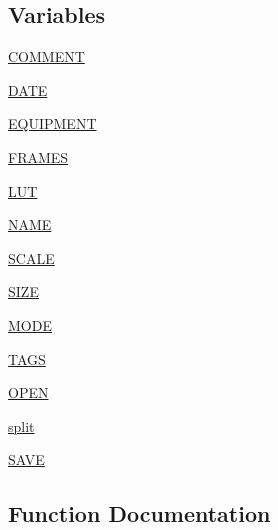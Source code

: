 \subsection*{Variables}
\begin{DoxyCompactItemize}
\item 
\hyperlink{namespacePIL_1_1ImImagePlugin_aa63e36c0a805f7711a938762dc2dd2fb}{C\+O\+M\+M\+E\+NT}
\item 
\hyperlink{namespacePIL_1_1ImImagePlugin_ae34c1a02aa3946d1d6780a08f8fbeecd}{D\+A\+TE}
\item 
\hyperlink{namespacePIL_1_1ImImagePlugin_aa696ff0d0cf51dbd046f461660374494}{E\+Q\+U\+I\+P\+M\+E\+NT}
\item 
\hyperlink{namespacePIL_1_1ImImagePlugin_ac31472366a2522dbd190602954a9fa7a}{F\+R\+A\+M\+ES}
\item 
\hyperlink{namespacePIL_1_1ImImagePlugin_a811631519bff08e117a288c941a2898f}{L\+UT}
\item 
\hyperlink{namespacePIL_1_1ImImagePlugin_ad86b67f48ffce30933911532847a6d6e}{N\+A\+ME}
\item 
\hyperlink{namespacePIL_1_1ImImagePlugin_ab80455cadcfedcd076f3ca41e5d7d96d}{S\+C\+A\+LE}
\item 
\hyperlink{namespacePIL_1_1ImImagePlugin_a0e4f278882f62d9ec6ee7b20db7f87ae}{S\+I\+ZE}
\item 
\hyperlink{namespacePIL_1_1ImImagePlugin_ab4317ba74d15dd41a7364f5f07e6a373}{M\+O\+DE}
\item 
\hyperlink{namespacePIL_1_1ImImagePlugin_aa33556838fc9418de04074f501e2ad6b}{T\+A\+GS}
\item 
\hyperlink{namespacePIL_1_1ImImagePlugin_a8bd71c673e3b9c152fda6b3e5b2022e3}{O\+P\+EN}
\item 
\hyperlink{namespacePIL_1_1ImImagePlugin_a80b2b04cc41efb0cc67fba1c12cb01bd}{split}
\item 
\hyperlink{namespacePIL_1_1ImImagePlugin_adda995198621a6f52a9ac600958968a9}{S\+A\+VE}
\end{DoxyCompactItemize}


\subsection{Function Documentation}
\mbox{\label{namespacePIL_1_1ImImagePlugin_a0a9d2b5e605aae6795d4cf7b169788f2}} 
